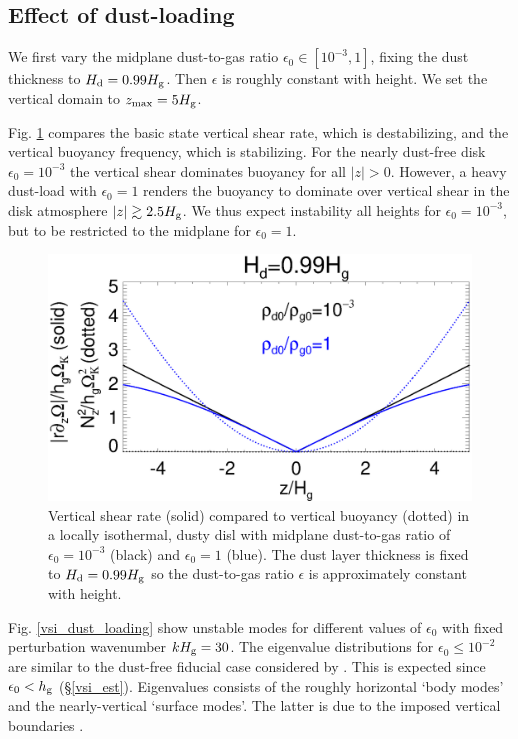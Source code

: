 
\subsection{Effect of dust-loading}
We first vary the midplane dust-to-gas ratio 
$\epsilon_0\in[10^{-3},1]$, fixing the dust thickness to  
$H_\mathrm{d}=0.99H_\mathrm{g}$. Then  $\epsilon$ is roughly constant with height. We
set the vertical domain to $z_\mathrm{max}=5H_\mathrm{g}$.  

Fig. \ref{compare_vshear_fixHd} compares the basic state
vertical shear rate, which is destabilizing, and the vertical buoyancy
frequency, which is stabilizing. For the nearly dust-free disk
$\epsilon_0=10^{-3}$ the vertical shear dominates buoyancy for all
$|z|>0$. However, a heavy dust-load with $\epsilon_0=1$ renders the 
buoyancy to dominate over vertical shear in the disk atmosphere 
$|z|\gtrsim 2.5H_\mathrm{g}$. We thus expect instability all heights for 
$\epsilon_0=10^{-3}$, but to be restricted to the midplane for
$\epsilon_0=1$. 

\begin{figure}
  \includegraphics[width=\linewidth]{figures/compare_vshear_Nz2_fixHd} 
  \caption{Vertical shear rate (solid) compared to vertical buoyancy
    (dotted) in a locally isothermal, dusty disl with midplane dust-to-gas ratio
    of $\epsilon_0=10^{-3}$ (black) and $\epsilon_0=1$ (blue). 
    The dust layer thickness is fixed to $H_\mathrm{d}=0.99H_\mathrm{g}$ so the 
    dust-to-gas ratio $\epsilon$ is approximately constant with
    height. 
    \label{compare_vshear_fixHd}
    }
\end{figure}

Fig. \ref{vsi_dust_loading} show unstable modes for different values
of $\epsilon_0$ with fixed perturbation wavenumber  $kH_\mathrm{g} = 30$. The
eigenvalue distributions for $\epsilon_0 \leq 10^{-2}$ are similar to the
dust-free fiducial case considered by . This is
expected since $\epsilon_0 < h_\mathrm{g}$ (\S\ref{vsi_est}). Eigenvalues 
consists 
of the roughly horizontal `body modes' and the nearly-vertical
`surface modes'. The latter is due to the imposed vertical boundaries
\citep{barker15}.  

